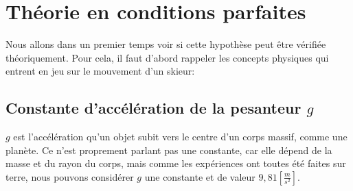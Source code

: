 \documentclass{article}
\begin{document}
\section{Théorie en conditions parfaites}

Nous allons dans un premier temps voir si cette hypothèse peut être vérifiée théoriquement. Pour cela, il faut d'abord rappeler les concepts physiques qui entrent en jeu sur le mouvement d'un skieur:

\subsection{Constante d'accélération de la pesanteur $g$}
$g$ est l'accélération qu'un objet subit vers le centre d'un corps massif, comme une planète. Ce n'est proprement parlant pas une constante, car elle dépend de la masse et du rayon du corps, mais comme les expériences ont toutes été faites sur terre, nous pouvons considérer $g$ une constante et de valeur $9,81[\frac{m}{s^2}]$.
\end{document}
